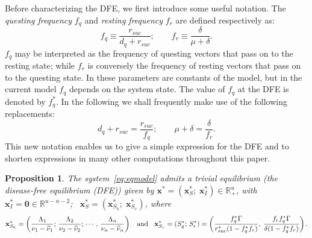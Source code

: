 \documentclass[a4paper]{article}
\newcommand{\varpiVar}{r_{suc}}
\newcommand{\hatmuVar}{d_q}
\newtheorem{prop}{Proposition}[section]
\begin{document}
Before characterizing the DFE, we first introduce some useful notation. The {\em questing frequency} $f_q$ and {\em resting frequency} $f_r$ are defined respectively as:
\[
f_q\equiv \frac{\varpiVar }{\hatmuVar+\varpiVar }; \qquad f_r\equiv \frac{\delta}{\mu+\delta}.
\]
$f_q$ may be interpreted as the frequency of questing vectors that pass on to the resting state; while $f_r$ is conversely the frequency of resting vectors that pass on to the questing state. In \cite{jckam201411} these parameters are constants of the model,  but in the current model $f_q$ depends on the system state. The value of $f_q$ at the DFE is denoted by $f^*_q$.   In the following we shall frequently make use of the following replacements:
\begin{equation}\label{eq:frfq}
\hatmuVar +\varpiVar =\frac{\varpiVar }{f_q}; \qquad \mu+\delta=
\frac{\delta}{f_r}.
\end{equation}
This new notation enables us to give a simple expression for the DFE and to shorten expressions in many other computations throughout this paper.
\begin{prop}\label{prop:stdst0}
The system~\eqref{eq:eqmodel} admits a trivial equilibrium (the disease-free equilibrium (DFE))  given by $\mathbf x^*=\left(\mathbf x_S^*;\;\mathbf x_I^*\right)\in\mathbb R^u_+$,  
 with $\mathbf x_I^*=\mathbf 0\in\mathbb R^{u-n-2}$;~ $\mathbf x_S^* =\left(\mathbf x_{S_h}^*;\;\mathbf x_{S_v}^*\right)$, where 
\begin{equation}\label{eq:eqexpdfe}\mathbf x_{S_h}^* = \left(\frac{\Lambda_1}{ \nu_1-\widetilde\nu_1};\,\frac{\Lambda_2}{ \nu_2-\widetilde\nu_2};\,\cdots,\,\frac{\Lambda_n}{ \nu_n-\widetilde\nu_n}\right)\;\;\hbox{ and }\;\; \mathbf x_{S_v}^* = (S_q^*;\,S_r^*) =\left( \frac{f^*_q\Gamma}{\varpiVar ^*(1-f^*_qf_r)},\;\frac{f_rf^*_q\Gamma}{\delta(1-f^*_qf_r)}\right).\end{equation} 
\end{prop}
\end{document}
